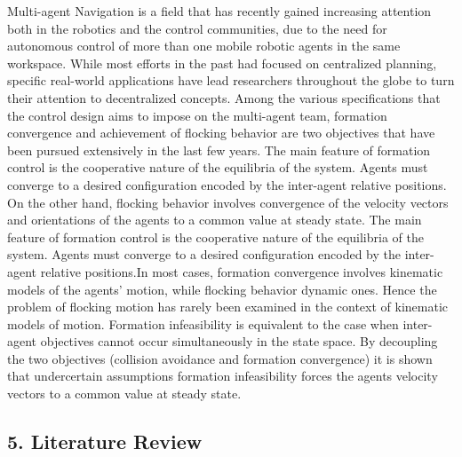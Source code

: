 \documentclass[12pt]{report}
\begin{document}
Multi-agent Navigation is a field that has recently gained increasing attention both in  the robotics and the control communities, due to the need for autonomous control of more than one mobile robotic agents in the same workspace. While  most  efforts  in  the  past  had  focused  on  centralized  planning, specific real-world applications have  lead researchers throughout the globe to turn their attention to decentralized concepts. Among  the  various  specifications  that  the  control  design  aims  to  impose  on  the  multi-agent  team,  formation convergence and achievement of flocking behavior are two objectives that have been pursued extensively in the last few years. The main feature of  formation control  is the cooperative nature of the equilibria of the system. Agents  must converge to a desired configuration encoded by the inter-agent relative positions.  On the other hand, flocking behavior involves convergence of the velocity vectors and orientations of the agents to a common value at steady state. The main feature of formation control is the cooperative nature of the equilibria of the system. Agents must converge to a desired configuration encoded by the inter-agent relative positions.In  most cases, formation convergence involves kinematic models of the agents’ motion, while  flocking behavior dynamic ones. Hence the problem of flocking motion has rarely been examined in the context of kinematic models of motion. Formation infeasibility is  equivalent to the case when inter-agent objectives cannot occur simultaneously in the state space. By decoupling the two objectives (collision avoidance and formation convergence) it is shown that undercertain assumptions formation infeasibility forces the agents velocity vectors to a common value at steady state.


\begin{center}
\chapter*{5.  Literature Review}
\end{center}
\end{document}
